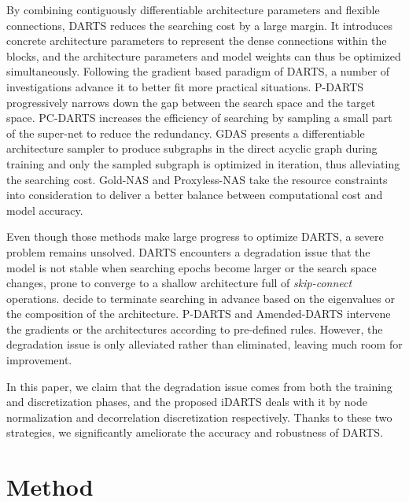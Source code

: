 \documentclass[journal]{IEEEtran}
\begin{document}
By combining contiguously differentiable architecture parameters and flexible connections, DARTS \cite{DBLP:conf/iclr/LiuSY19} reduces the searching cost by a large margin. It introduces concrete architecture parameters to represent the dense connections within the blocks, and the architecture parameters and model weights can thus be optimized simultaneously. Following the gradient based paradigm of DARTS, a number of investigations advance it to better fit more practical situations. P-DARTS \cite{DBLP:journals/corr/abs-1904-12760} progressively narrows down the gap between the search space and the target space. PC-DARTS \cite{DBLP:journals/corr/abs-1907-05737} increases the efficiency of searching by sampling a small part of the super-net to reduce the redundancy. GDAS \cite{DBLP:conf/cvpr/DongY19} presents a differentiable architecture sampler to produce subgraphs in the direct acyclic graph during training and only the sampled subgraph is optimized  in iteration, thus alleviating the searching cost. Gold-NAS \cite{DBLP:journals/corr/abs-2007-03331} and Proxyless-NAS \cite{DBLP:conf/iclr/CaiZH19} take the resource constraints into consideration to deliver a better balance between computational cost and model accuracy. 

Even though those methods make large progress to optimize DARTS, a severe problem remains unsolved.  DARTS encounters a degradation issue that the model is not stable when searching epochs become larger or the search space changes, prone to converge to a shallow architecture full of \textit{skip-connect} operations. \cite{DBLP:conf/iclr/ZelaESMBH20,DBLP:journals/corr/abs-1909-06035} decide to terminate searching in advance based on the eigenvalues or the composition of the architecture. P-DARTS \cite{DBLP:journals/corr/abs-1904-12760} and Amended-DARTS \cite{DBLP:journals/corr/abs-1910-11831} intervene the gradients or the architectures according to pre-defined rules. However, the degradation issue is only alleviated rather than eliminated, leaving much room for improvement. 


In this paper, we claim that the degradation issue comes from both the training and discretization phases, and the proposed iDARTS deals with it by node normalization and decorrelation discretization respectively. Thanks to these two strategies, we significantly ameliorate the accuracy and robustness of DARTS.


\section{Method}
\label{S.Method}
\end{document}
